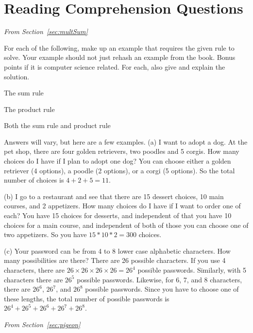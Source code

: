 \section{Reading Comprehension Questions}

\noindent
{\em From Section~\ref{sec:multSum}}

\begin{requ}
For each of the following, make up an example that requires the given rule to solve.
Your example should not just rehash an example from the book.
Bonus points if it is computer science related.
For each, also give and explain the solution.
\begin{lenum}
\item The sum rule
\item The product rule
\item Both the sum rule and product rule
\end{lenum}
\begin{requanswer}
Answers will vary, but here are a few examples.
(a) I want to adopt a dog. At the pet shop, there are four golden retrievers, two poodles and 5 corgis. 
How many choices do I have if I plan to adopt one dog? 
You can choose either a golden retriever (4 options), a poodle (2 options), or a corgi (5 options).
So the total number of choices is $4 + 2 + 5 = 11$.

(b) I go to a restaurant and see that there are 15 dessert choices, 
10 main courses, and 2 appetizers. How many choices do I have if I want to order one of each?
You have 15 choices for desserts, and independent of that you have 10 choices for a main course,
and independent of both of those you can choose one of two appetizers. 
So you have $15 * 10 * 2 = 300$ choices.

(c) Your password can be from 4 to 8 lower case alphabetic characters. How many possibilities are there?
There are 26 possible characters. If you use 4 characters, there are 
$26\times 26\times 26\times 26 = 26^4$ possible passwords.
Similarly, with 5 characters there are $26^5$ possible passwords.
Likewise, for 6, 7, and 8 characters, there are $26^6$, $26^7$, and $26^8$ possible passwords.
Since you have to choose one of these lengths, the total number of possible passwords is
$26^4+26^5+26^6+26^7+26^8$. 
\end{requanswer}
\end{requ}

\noindent
{\em From Section~\ref{sec:pigeon}}

